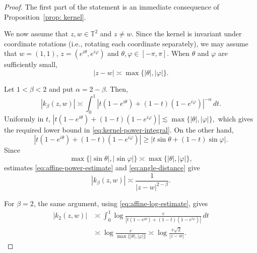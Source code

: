 \documentclass[10pt,a4paper]{amsart}
\begin{document}
\begin{proof}
    The first part of the statement is an immediate consequence of Proposition~\ref{prop: kernel}. 

        We now assume that \(z,w\in\mathbb T^2\) and \(z\neq w\).
    Since the kernel is invariant under coordinate rotations (i.e., rotating each coordinate separately), we may
    assume that
    $w=(1,1)$, $z=(e^{i\theta},e^{i\varphi})$ and $\theta,\varphi\in[-\pi,\pi].$    When \(\theta\) and \(\varphi\) are sufficiently small,
    \begin{equation}
        |z-w|\asymp \max\{|\theta|,|\varphi|\}.
        \label{eq:angle-distance}
    \end{equation}

    Let \(1<\beta<2\) and put \(\alpha=2-\beta\). Then,
    \begin{equation}
        |k_\beta(z,w)|
        \asymp
        \int_0^1
        \left|
            t(1-e^{i\theta})+(1-t)(1-e^{i\varphi})
        \right|^{-\alpha}\,dt.
        \label{eq:kernel-power-integral}
    \end{equation}
    Uniformly in \(t\),
    $
        \left|
            t(1-e^{i\theta})+(1-t)(1-e^{i\varphi})
        \right|
        \lesssim\max\{|\theta|,|\varphi|\},
    $
    which gives the required lower bound in
    \eqref{eq:kernel-power-integral}. On the other hand,
    \[
        \left|
            t(1-e^{i\theta})+(1-t)(1-e^{i\varphi})
        \right|
        \geq
        |t\sin\theta+(1-t)\sin\varphi|.
    \]
    Since
    \[
        \max\{|\sin\theta|,|\sin\varphi|\}
        \asymp\max\{|\theta|,|\varphi|\},
    \]
    estimates \eqref{eq:affine-power-estimate} and
    \eqref{eq:angle-distance} give
    \[
        |k_\beta(z,w)|
        \asymp
        \frac{1}{|z-w|^{2-\beta}}.
    \]

    For \(\beta=2\), the same
    argument, using \eqref{eq:affine-log-estimate}, gives
    \[
    \begin{aligned}
        |k_2(z,w)|
        &\asymp
        \int_0^1
        \log\frac{e}{
        \left|t(1-e^{i\theta})+(1-t)(1-e^{i\varphi})\right|}
        \,dt \\
        &\asymp
        \log\frac{e}{\max\{|\theta|,|\varphi|\}}
        \asymp
        \log\frac{e\sqrt2}{|z-w|}.
    \end{aligned}
    \]
\end{proof}
\end{document}
